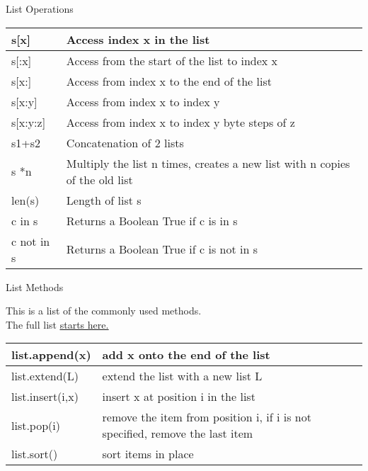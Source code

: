 % 
% 
% 
\begin{Slide}{List Operations}


  \begin{table}[h]
    \begin{tabular}{|l|p{8cm}|} \hline
      s[x]    & Access index x in the list \\ \hline
      s[:x]    & Access from the start of the list to index x \\ \hline
      s[x:]  & Access from index x to the end of the list \\ \hline 
      s[x:y]    & Access from index x to index y \\ \hline
      s[x:y:z]   & Access from index x to index y byte steps of z\\ \hline
      s1+s2   & Concatenation of 2 lists \\ \hline
      s *n  & Multiply the list n times, creates a new list with n copies of the old list \\ \hline
      len(s) & Length of list s \\ \hline
      c in s & Returns a Boolean True if c is in s \\ \hline
      c not in s & Returns a Boolean True if c is not in s \\ \hline
    \end{tabular}
  \end{table}

\end{Slide}

% 
% 
% 
\begin{Slide}{List Methods}

  This is a list of the commonly used methods.\\
  The full list \underline{\href{https://docs.python.org/3/tutorial/datastructures.html\#data-structures}{starts here.}}

  \begin{table}[h]
    \begin{tabular}{|l|p{8cm}|} \hline
      list.append(x)    & add x onto the end of the list \\ \hline
      list.extend(L)    & extend the list with a new list L \\ \hline
      list.insert(i,x)    & insert x at position i in the list \\ \hline
      list.pop(i)    & remove the item from position i, if i is not specified, remove the last item \\ \hline
      list.sort()    & sort items in place \\ \hline
    \end{tabular}
  \end{table}

\end{Slide}


